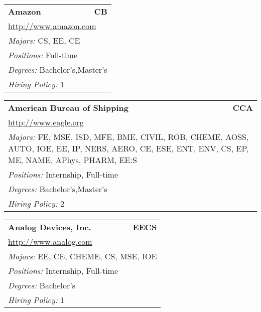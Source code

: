 \documentclass[twoside]{article}
\begin{document}
\begin{center}
\begin{multicols}{3}
\begin{FlushLeft}
\begin{minipage}{\columnwidth}
\end{minipage}
 
\begin{minipage}{\columnwidth}\begin{tabularx}{.95\columnwidth}{Xr}
                 {\Large\bf Amazon} & {\Large\bf CB}\\
    \multicolumn{2}{p{.95\columnwidth}}{\url{http://www.amazon.com}}\\
    \multicolumn{2}{p{.95\columnwidth}}{\emph{Majors:} CS, EE, CE}\\
    \multicolumn{2}{p{.95\columnwidth}}{\emph{Positions:} Full-time}\\
    \multicolumn{2}{p{.95\columnwidth}}{\emph{Degrees:} Bachelor's,Master's}\\
    \multicolumn{2}{p{.95\columnwidth}}{\emph{Hiring Policy:} 1}\\
    \end{tabularx}
    
\end{minipage}
 
\begin{minipage}{\columnwidth}\begin{tabularx}{.95\columnwidth}{Xr}
                 {\Large\bf American Bureau of Shipping} & {\Large\bf CCA}\\
    \multicolumn{2}{p{.95\columnwidth}}{\url{http://www.eagle.org}}\\
    \multicolumn{2}{p{.95\columnwidth}}{\emph{Majors:} FE, MSE, ISD, MFE, BME, CIVIL, ROB, CHEME, AOSS, AUTO, IOE, EE, IP, NERS, AERO, CE, ESE, ENT, ENV, CS, EP, ME, NAME, APhys, PHARM, EE:S}\\
    \multicolumn{2}{p{.95\columnwidth}}{\emph{Positions:} Internship, Full-time}\\
    \multicolumn{2}{p{.95\columnwidth}}{\emph{Degrees:} Bachelor's,Master's}\\
    \multicolumn{2}{p{.95\columnwidth}}{\emph{Hiring Policy:} 2}\\
    \end{tabularx}
    
\end{minipage}
 
\begin{minipage}{\columnwidth}\begin{tabularx}{.95\columnwidth}{Xr}
                 {\Large\bf Analog Devices, Inc.} & {\Large\bf EECS}\\
    \multicolumn{2}{p{.95\columnwidth}}{\url{http://www.analog.com}}\\
    \multicolumn{2}{p{.95\columnwidth}}{\emph{Majors:} EE, CE, CHEME, CS, MSE, IOE}\\
    \multicolumn{2}{p{.95\columnwidth}}{\emph{Positions:} Internship, Full-time}\\
    \multicolumn{2}{p{.95\columnwidth}}{\emph{Degrees:} Bachelor's}\\
    \multicolumn{2}{p{.95\columnwidth}}{\emph{Hiring Policy:} 1}\\
    \end{tabularx}
    

\end{minipage}
\end{FlushLeft}
\end{multicols}
\end{center}
\end{document}
